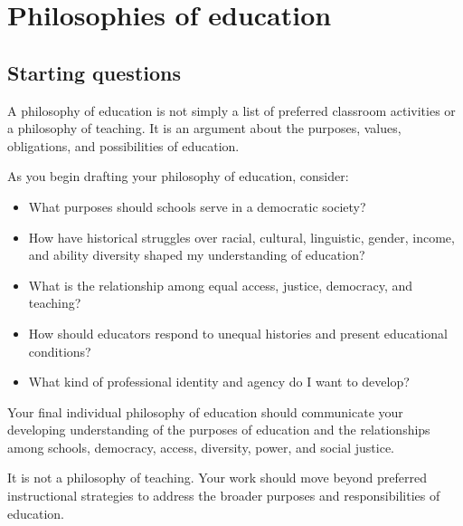 \documentclass[
  letterpaper,
  DIV=11,
  numbers=noendperiod]{scrartcl}
\providecommand{\tightlist}{%
  \setlength{\itemsep}{0pt}\setlength{\parskip}{0pt}}\usepackage{longtable,booktabs,array}
\begin{document}
\section{Philosophies of education}\label{philosophies-of-education}

\subsection{Starting questions}\label{starting-questions}

A philosophy of education is not simply a list of preferred classroom
activities or a philosophy of teaching. It is an argument about the
purposes, values, obligations, and possibilities of education.

As you begin drafting your philosophy of education, consider:

\begin{itemize}
\tightlist
\item
  What purposes should schools serve in a democratic society?
\item
  How have historical struggles over racial, cultural, linguistic,
  gender, income, and ability diversity shaped my understanding of
  education?
\item
  What is the relationship among equal access, justice, democracy, and
  teaching?
\item
  How should educators respond to unequal histories and present
  educational conditions?
\item
  What kind of professional identity and agency do I want to develop?
\end{itemize}

\begin{tcolorbox}[enhanced jigsaw, colframe=quarto-callout-important-color-frame, rightrule=.15mm, opacitybacktitle=0.6, leftrule=.75mm, colback=white, breakable, coltitle=black, arc=.35mm, bottomrule=.15mm, titlerule=0mm, left=2mm, colbacktitle=quarto-callout-important-color!10!white, title=\textcolor{quarto-callout-important-color}{\faExclamation}\hspace{0.5em}{Philosophy of education}, toprule=.15mm, bottomtitle=1mm, toptitle=1mm, opacityback=0]

Your final individual philosophy of education should communicate your
developing understanding of the purposes of education and the
relationships among schools, democracy, access, diversity, power, and
social justice.

It is not a philosophy of teaching. Your work should move beyond
preferred instructional strategies to address the broader purposes and
responsibilities of education.

\end{tcolorbox}
\end{document}
